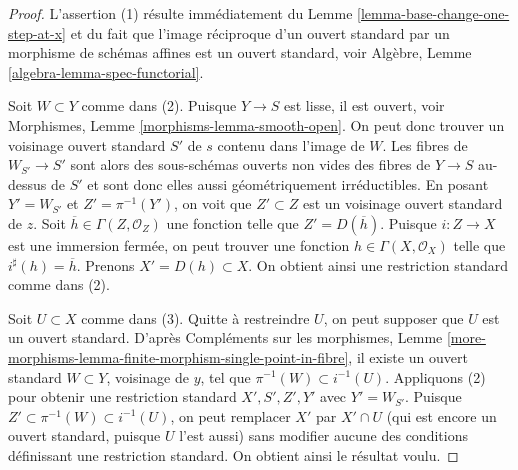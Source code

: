 \begin{proof}
L'assertion (1) résulte immédiatement du
Lemme \ref{lemma-base-change-one-step-at-x}
et du fait que l'image réciproque d'un ouvert standard par un morphisme
de schémas affines est un ouvert standard, voir
Algèbre, Lemme \ref{algebra-lemma-spec-functorial}.

\medskip\noindent
Soit $W \subset Y$ comme dans (2). Puisque $Y \to S$ est lisse, il est ouvert, voir
Morphismes, Lemme \ref{morphisms-lemma-smooth-open}.
On peut donc trouver un voisinage ouvert standard $S'$ de $s$
contenu dans l'image de $W$. Les fibres de $W_{S'} \to S'$
sont alors des sous-schémas ouverts non vides des fibres de $Y \to S$ au-dessus de $S'$
et sont donc elles aussi géométriquement irréductibles. En posant $Y' = W_{S'}$
et $Z' = \pi^{-1}(Y')$, on voit que $Z' \subset Z$ est un voisinage ouvert standard
de $z$. Soit $\overline{h} \in \Gamma(Z, \mathcal{O}_Z)$
une fonction telle que $Z' = D(\overline{h})$. Puisque $i : Z \to X$
est une immersion fermée, on peut trouver une fonction $h \in \Gamma(X, \mathcal{O}_X)$
telle que $i^\sharp(h) = \overline{h}$. Prenons $X' = D(h) \subset X$.
On obtient ainsi une restriction standard comme dans (2).

\medskip\noindent
Soit $U \subset X$ comme dans (3). Quitte à restreindre $U$, on peut supposer que
$U$ est un ouvert standard. D'après
Compléments sur les morphismes,
Lemme \ref{more-morphisms-lemma-finite-morphism-single-point-in-fibre},
il existe un ouvert standard $W \subset Y$, voisinage de $y$, tel
que $\pi^{-1}(W) \subset i^{-1}(U)$. Appliquons (2) pour obtenir une restriction
standard $X', S', Z', Y'$ avec $Y' = W_{S'}$. Puisque
$Z' \subset \pi^{-1}(W) \subset i^{-1}(U)$, on peut remplacer $X'$ par
$X' \cap U$ (qui est encore un ouvert standard, puisque $U$ l'est aussi)
sans modifier aucune des conditions définissant une restriction standard.
On obtient ainsi le résultat voulu.
\end{proof}

